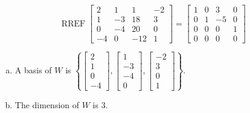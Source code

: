 \begin{exerciseAnswer} 


\[\operatorname{RREF} \left[\begin{array}{cccc}
2 & 1 & 1 & -2 \\
1 & -3 & 18 & 3 \\
0 & -4 & 20 & 0 \\
-4 & 0 & -12 & 1
\end{array}\right] = \left[\begin{array}{cccc}
1 & 0 & 3 & 0 \\
0 & 1 & -5 & 0 \\
0 & 0 & 0 & 1 \\
0 & 0 & 0 & 0
\end{array}\right] \]


\begin{enumerate}[(a)]
\item A basis of \(W\) is \( \left\{ \left[\begin{array}{c}
2 \\
1 \\
0 \\
-4
\end{array}\right] , \left[\begin{array}{c}
1 \\
-3 \\
-4 \\
0
\end{array}\right] , \left[\begin{array}{c}
-2 \\
3 \\
0 \\
1
\end{array}\right] \right\} \).
\item The dimension of \(W\) is \( 3 \).
\end{enumerate}
    
\end{exerciseAnswer}
    

